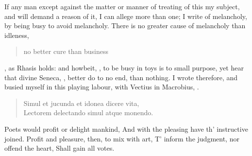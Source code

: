 {If any man except against the matter or manner of treating of this my
subject, and will demand a reason of it, I can allege more than one; I
write of melancholy, by being busy to avoid melancholy. There is no
greater cause of melancholy than idleness, \blockquote{no better cure than business}, as Rhasis holds: and howbeit,
, to be busy in toys is to small purpose, yet hear that
divine Seneca, , better do to no end, than
nothing. I wrote therefore, and busied myself in this playing labour,
 with Vectius in
Macrobius, .
\begin{verse}
Simul et jucunda et idonea dicere vita,\\
Lectorem delectando simul atque monendo.
\end{verse}

Poets would profit or delight mankind,
And with the pleasing have th' instructive joined.
Profit and pleasure, then, to mix with art,
T' inform the judgment, nor offend the heart,
Shall gain all votes.

}
